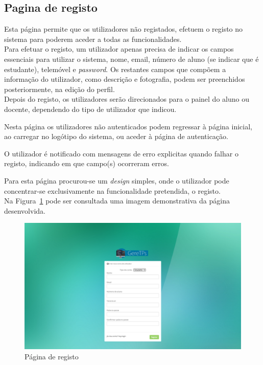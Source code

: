 \subsection{Pagina de registo}

Esta página permite que os utilizadores não registados, efetuem o registo no sistema para poderem aceder a todas as funcionalidades.\\

Para efetuar o registo, um utilizador apenas precisa de indicar os campos essenciais para utilizar o sistema, nome, email, número de aluno (se indicar que é estudante), telemóvel e \textit{password}.
Os restantes campos que compõem a informação do utilizador, como descrição e fotografia, podem ser preenchidos posteriormente, na edição do perfil.\\

Depois do registo, os utilizadores serão direcionados para o painel do aluno ou docente, dependendo do tipo de utilizador que indicou.

Nesta página os utilizadores não autenticados podem regressar à página inicial, ao carregar no logótipo do sistema, ou aceder à página de autenticação.

O utilizador é notificado com mensagens de erro explicitas quando falhar o registo, indicando em que campo(s) ocorreram erros. 

Para esta página procurou-se um \textit{design} simples, onde o utilizador pode concentrar-se exclusivamente na funcionalidade pretendida, o registo.\\

Na Figura~\ref{fig:sign_up} pode ser consultada uma imagem demonstrativa da página desenvolvida.\\

\begin{figure}[H]
  \centering
  \includegraphics[width=1\textwidth,center]{images/implementacao/sign_up}
  \caption{Página de registo}
  \label{fig:sign_up}
\end{figure}
